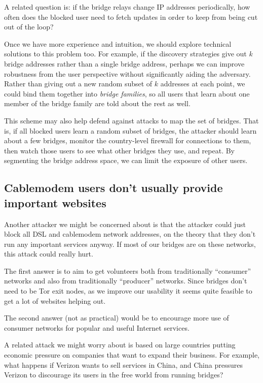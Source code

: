 \documentclass{llncs}
\begin{document}
A related question is: if the bridge relays change IP addresses
periodically, how often does the blocked user need to fetch updates in
order to keep from being cut out of the loop?

Once we have more experience and intuition, we should explore technical
solutions to this problem too. For example, if the discovery strategies
give out $k$ bridge addresses rather than a single bridge address, perhaps
we can improve robustness from the user perspective without significantly
aiding the adversary. Rather than giving out a new random subset of $k$
addresses at each point, we could bind them together into \emph{bridge
families}, so all users that learn about one member of the bridge family
are told about the rest as well.

This scheme may also help defend against attacks to map the set of
bridges. That is, if all blocked users learn a random subset of bridges,
the attacker should learn about a few bridges, monitor the country-level
firewall for connections to them, then watch those users to see what
other bridges they use, and repeat. By segmenting the bridge address
space, we can limit the exposure of other users.

\subsection{Cablemodem users don't usually provide important websites}
\label{subsec:block-cable}

Another attacker we might be concerned about is that the attacker could
just block all DSL and cablemodem network addresses, on the theory that
they don't run any important services anyway. If most of our bridges
are on these networks, this attack could really hurt.

The first answer is to aim to get volunteers both from traditionally
``consumer'' networks and also from traditionally ``producer'' networks.
Since bridges don't need to be Tor exit nodes, as we improve our usability
it seems quite feasible to get a lot of websites helping out.

The second answer (not as practical) would be to encourage more use of
consumer networks for popular and useful Internet services. 

A related attack we might worry about is based on large countries putting
economic pressure on companies that want to expand their business. For
example, what happens if Verizon wants to sell services in China, and
China pressures Verizon to discourage its users in the free world from
running bridges?
\end{document}
